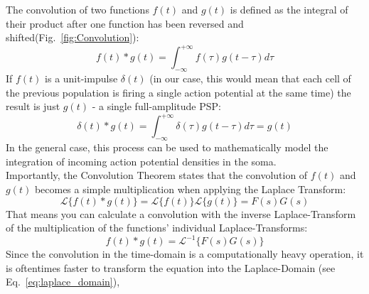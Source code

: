 %
{}
{
    The convolution of two functions $f(t)$ and $g(t)$ is defined as the integral of their product after one function
    has been reversed and shifted\footnotemark (Fig.~\ref{fig:Convolution}):
    \[f(t) \ast g(t)= \int_{-\infty}^{+\infty}f(\tau)g(t-\tau) d\tau\]
    If $f(t)$ is a unit-impulse $\delta(t)$ (in our case, this would mean that each cell of the previous population
    is firing a single action potential at the same time) the result is just $g(t)$ - a
    single full-amplitude PSP:
    \[\delta(t) \ast g(t)= \int_{-\infty}^{+\infty}\delta(\tau)g(t-\tau) d\tau = g(t)\]
    In the general case, this process can be used to mathematically model the integration of
    incoming action potential densities in the soma.\\[1em]
    Importantly, the Convolution Theorem states that the convolution of $f(t)$ and $g(t)$ becomes a
    simple multiplication when applying the Laplace Transform:
    \[\mathscr{L}\{f(t) \ast g(t)\}= \mathscr{L}\{f(t)\}\mathscr{L}\{g(t)\} = F(s)G(s)\]
    That means you can calculate a convolution with the inverse Laplace-Transform of the multiplication of
    the functions' individual Laplace-Transforms:
    \[f(t) \ast g(t)= \mathscr{L}^{-1}\{F(s)G(s)\}\]
}
Since the convolution in the time-domain is a computationally heavy operation,
it is oftentimes faster to transform the equation into the Laplace-Domain (see Eq.~\ref{eq:laplace_domain}),
